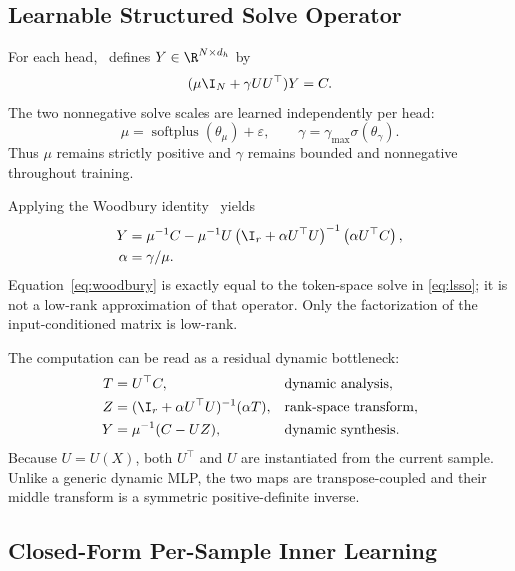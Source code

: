 \subsection{Learnable Structured Solve Operator}

For each head, \LSSO\ defines $Y\in\R^{N\times d_h}$ by
\begin{equation}
  (\mu\I_N+\gamma UU^\top)Y=C.
  \label{eq:lsso}
\end{equation}
The two nonnegative solve scales are learned independently per head:
\begin{equation}
  \mu=\operatorname{softplus}(\theta_\mu)+\varepsilon,
  \qquad
  \gamma=\gamma_{\max}\sigma(\theta_\gamma).
  \label{eq:scales}
\end{equation}
Thus $\mu$ remains strictly positive and $\gamma$ remains bounded and nonnegative throughout training.

Applying the Woodbury identity~\cite{woodbury1950identity} yields
\begin{align}
  Y
  &=\mu^{-1}C
  -\mu^{-1}U
  \left(\I_r+\alpha U^\top U\right)^{-1}
  \left(\alpha U^\top C\right),
  \label{eq:woodbury}\\
  \alpha&=\gamma/\mu.
\end{align}
Equation~\eqref{eq:woodbury} is exactly equal to the token-space solve in \cref{eq:lsso}; it is not a low-rank approximation of that operator. Only the factorization of the input-conditioned matrix is low-rank.

The computation can be read as a residual dynamic bottleneck:
\begin{align}
  T &= U^\top C, & &\text{dynamic analysis},\\
  Z &= (\I_r+\alpha U^\top U)^{-1}(\alpha T),
      & &\text{rank-space transform},\\
  Y &= \mu^{-1}(C-UZ), & &\text{dynamic synthesis}.
  \label{eq:bottleneck}
\end{align}
Because $U=U(X)$, both $U^\top$ and $U$ are instantiated from the current sample. Unlike a generic dynamic MLP, the two maps are transpose-coupled and their middle transform is a symmetric positive-definite inverse.

\subsection{Closed-Form Per-Sample Inner Learning}

